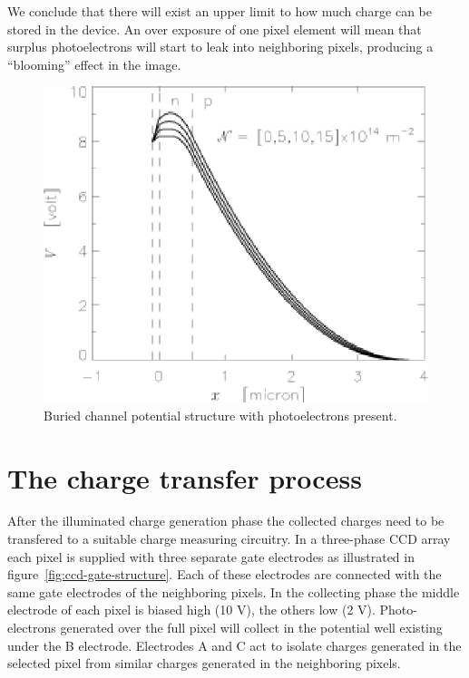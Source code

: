 We conclude that there will exist an upper limit to how much charge
can be stored in the device. An over exposure of one pixel element
will mean that surplus photoelectrons will start to leak into
neighboring pixels, producing a ``blooming'' effect in the image.


\begin{figure}[h]
  \centering
	\includegraphics{CCD_burchanph.eps}
  \caption{Buried channel potential structure with photoelectrons present.}
  \label{CCD.figburchanph}
\end{figure}




\section{The charge transfer process} 

After the illuminated charge generation phase the collected charges
need to be transfered to a suitable charge measuring circuitry. In a
three-phase CCD array each pixel is supplied with three separate gate
electrodes as illustrated in figure~\ref{fig:ccd-gate-structure}.
Each of these electrodes are connected with the
same gate electrodes of the neighboring pixels.  In the
collecting phase the middle electrode of each pixel is biased high (10
V), the others low (2 V). Photo-electrons generated over the full pixel
will collect in the potential well existing under the B electrode.
Electrodes A and C act to isolate charges generated in the selected
pixel from similar charges generated in the neighboring pixels.


